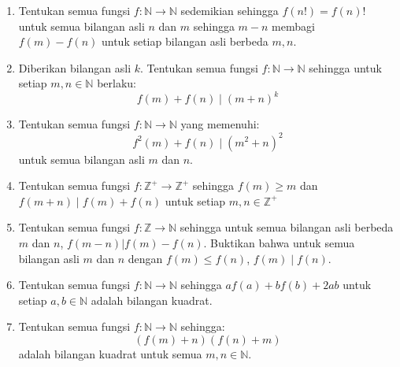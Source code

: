 \documentclass[11pt]{scrartcl}
\begin{document}
\begin{enumerate}
    \item Tentukan semua fungsi $f : \mathbb{N} \to \mathbb{N}$ sedemikian sehingga $f(n!) = f(n)!$ untuk semua bilangan asli $n$ dan $m$ sehingga $m - n$ membagi $f(m) - f(n)$ untuk setiap bilangan asli berbeda $m, n$.
    
    \item Diberikan bilangan asli $k$. Tentukan semua fungsi $f : \mathbb{N} \to \mathbb{N}$ sehingga untuk setiap $m, n \in \mathbb{N}$ berlaku:
    \[
    f(m)+f(n) \mid (m+n)^k
    \]
    
    \item Tentukan semua fungsi $f : \mathbb{N} \to \mathbb{N}$ yang memenuhi:
    \[
    f^2(m)+f(n) \mid (m^2+n)^2
    \]
    untuk semua bilangan asli $m$ dan $n$.
    
    \item Tentukan semua fungsi $f : \mathbb{Z}^+ \to \mathbb{Z}^+$ sehingga $f(m) \ge m$ dan $f(m+n) \mid f(m) + f(n)$ untuk setiap $m, n \in \mathbb{Z}^+$
    
    \item Tentukan semua fungsi $f : \mathbb{Z} \to \mathbb{N}$ sehingga untuk semua bilangan asli berbeda $m$ dan $n$, $f(m - n) | f(m) - f(n)$. Buktikan bahwa untuk semua bilangan asli $m$ dan $n$ dengan $f(m) \le f(n)$, $f(m) \mid f(n)$.
    
    \item Tentukan semua fungsi $f : \mathbb{N} \to \mathbb{N}$ sehingga $af(a) + bf(b) + 2ab$ untuk setiap $a, b \in \mathbb{N}$ adalah bilangan kuadrat.
    
    \item Tentukan semua fungsi $f : \mathbb{N} \to \mathbb{N}$ sehingga:
    \[
    (f(m)+n)(f(n)+m)
    \]
    adalah bilangan kuadrat untuk semua $m, n \in \mathbb{N}$.
\end{enumerate}
\end{document}
